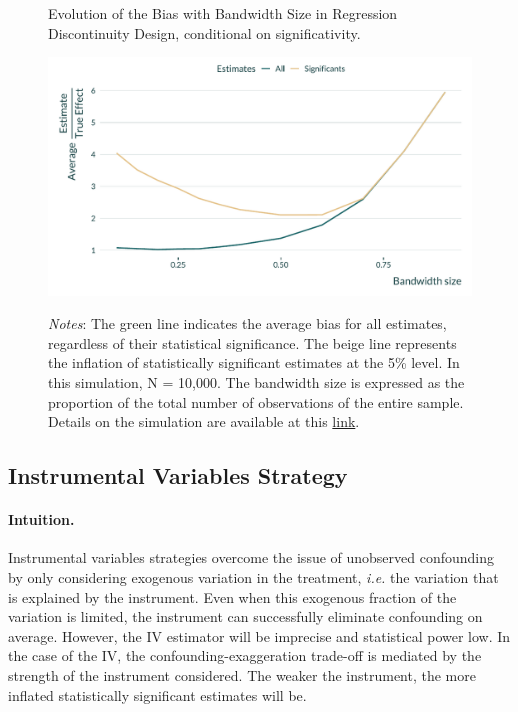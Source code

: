 \documentclass[usletter, 12pt]{article}
\begin{document}
       			 \begin{figure}[!h] 
				\begin{center}
					\caption{Evolution of the Bias with Bandwidth Size in Regression Discontinuity Design, conditional on significativity.}
					\label{graph_RDD}
					\includegraphics[width=0.8\linewidth]{images/main_graph_RDD_paper.pdf}
		      			\caption*{\footnotesize \textit{Notes}: The green line indicates the average bias for all estimates, regardless of their statistical significance. The beige line represents the inflation of statistically significant estimates at the 5\% level. In this simulation, N = 10,000. The bandwidth size is expressed as the proportion of the total number of observations of the entire sample. Details on the simulation are available at this \href{https://vincentbagilet.github.io/causal_inflation/RDD.html}{link}.}
				\end{center}
				\vspace{-1cm}
			\end{figure} 
		

        
		
        		\subsection{Instrumental Variables Strategy}\label{sim_IV}
            
                		\paragraph{Intuition.} 
        			Instrumental variables strategies overcome the issue of unobserved confounding by only considering exogenous variation in the treatment, \textit{i.e.} the variation that is explained by the instrument. Even when this exogenous fraction of the variation is limited, the instrument can successfully eliminate confounding on average. However, the IV estimator will be imprecise and statistical power low. In the case of the IV, the confounding-exaggeration trade-off is mediated by the strength of the instrument considered. The weaker the instrument, the more inflated statistically significant estimates will be.
        		
\end{document}

